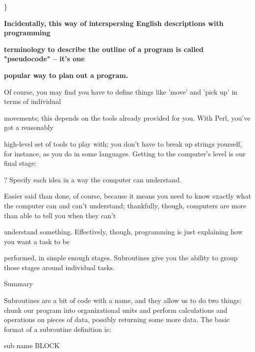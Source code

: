 \documentclass[a4paper,11pt]{book}
\begin{document}
\noindent \}

\noindent 

\noindent 

\noindent \textbf{Incidentally, this way of interspersing English descriptions with programming}

\noindent \textbf{terminology to describe the outline of a program is called "pseudocode" -- it's one}

\noindent \textbf{popular way to plan out a program.}

\noindent 

\noindent 

\noindent Of course, you may find you have to define things like 'move' and 'pick up' in terms of individual

\noindent movements; this depends on the tools already  provided for you. With Perl, you've got a reasonably

\noindent high-level set of tools to play with; you don't have to break up strings yourself, for  instance, as you do in some languages. Getting to the computer's level is our final stage:

\noindent 

\noindent ? Specify each idea in a way the computer can understand.

\noindent 

\noindent Easier said than done, of course, because it means you need to know exactly what the computer can and can't understand; thankfully, though, computers are more than able to tell you when they can't

\noindent understand something. Effectively, though, programming is just explaining how you want a task to be

\noindent performed, in simple enough stages. Subroutines give you the ability to group those stages around individual tasks.

\noindent 

\noindent 

\noindent Summary

\noindent 

\noindent Subroutines are a bit of code with a name, and they allow us to do two things: chunk our program into organizational units and perform calculations and operations on pieces of data, possibly returning some more data. The basic format of a subroutine definition is:

\noindent 

\noindent 

\noindent sub name BLOCK
\end{document}
